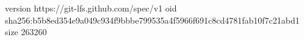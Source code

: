 version https://git-lfs.github.com/spec/v1
oid sha256:b5b8ed354e9a049c934f9bbbe799535a4f5966f691c8cd4781fab10f7c21abd1
size 263260

